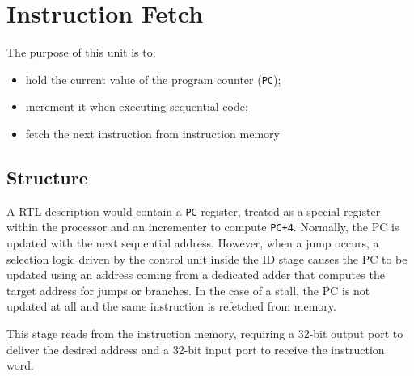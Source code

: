 \section{Instruction Fetch}
The purpose of this unit is to:
\begin{itemize}
	\item hold the current value of the program counter (\texttt{PC}); 
	\item increment it when executing sequential code;
	\item fetch the next instruction from instruction memory
\end{itemize}

\subsection{Structure} A RTL description would contain a \texttt{PC} register, treated as a special register within the processor and an incrementer to compute \texttt{PC+4}. Normally, the PC is updated with the next sequential address. However, when a jump occurs, a selection logic driven by the control unit inside the ID stage causes the PC to be updated using an address coming from a dedicated adder that computes the target address for jumps or branches. In the case of a stall, the PC is not updated at all and the same instruction is refetched from memory.

This stage reads from the instruction memory, requiring a 32-bit output port to deliver the desired address and a 32-bit input port to receive the instruction word. 